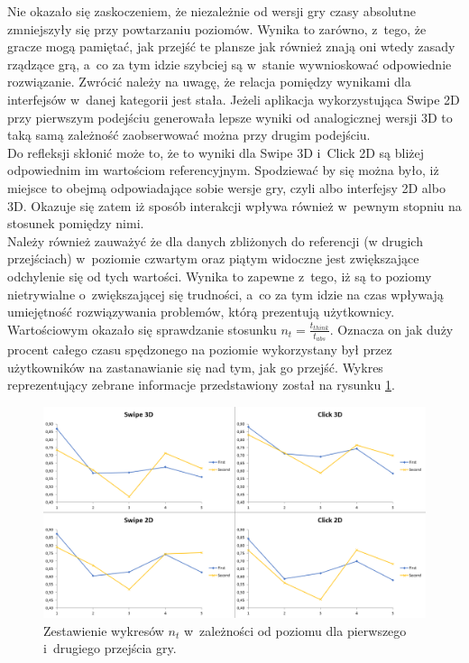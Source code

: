 \documentclass[a4paper,12pt,numbers=noenddot]{report}
\begin{document}
Nie okazało się zaskoczeniem, że niezależnie od wersji gry czasy absolutne zmniejszyły się przy powtarzaniu poziomów. Wynika to zarówno, z~tego, że gracze mogą pamiętać, jak przejść te plansze jak również znają oni wtedy zasady rządzące grą, a~co za tym idzie szybciej są w~stanie wywnioskować odpowiednie rozwiązanie. Zwrócić należy na uwagę, że relacja pomiędzy wynikami dla interfejsów w~danej kategorii jest stała. Jeżeli aplikacja wykorzystująca Swipe 2D przy pierwszym podejściu generowała lepsze wyniki od analogicznej wersji 3D to taką samą zależność zaobserwować można przy drugim podejściu.\\
Do refleksji skłonić może to, że to wyniki dla Swipe 3D i~Click 2D są bliżej odpowiednim im wartościom referencyjnym. Spodziewać by się można było, iż miejsce to obejmą odpowiadające sobie wersje gry, czyli albo interfejsy 2D albo 3D. Okazuje się zatem iż sposób interakcji wpływa również w~pewnym stopniu na stosunek pomiędzy nimi. \\
Należy również zauważyć że dla danych zbliżonych do referencji (w drugich przejściach) w~poziomie czwartym oraz piątym widoczne jest zwiększające odchylenie się od tych wartości. Wynika to zapewne z~tego, iż są to poziomy nietrywialne o~zwiększającej się trudności, a~co za tym idzie na czas wpływają umiejętność rozwiązywania problemów, którą prezentują użytkownicy.\\

Wartościowym okazało się sprawdzanie stosunku $n_{t} = \frac{t_{think}}{t_{abs}}$. Oznacza on jak duży procent całego czasu spędzonego na poziomie wykorzystany był przez użytkowników na zastanawianie się nad tym, jak go przejść. Wykres reprezentujący zebrane informacje przedstawiony został na rysunku \ref{fig:diag:ref:tThink_tAbs}.

\begin{figure}[h!]
	\centering
  	\includegraphics[width=\linewidth]{diag/ref_tThink_tAbs.png}
	\caption{Zestawienie wykresów $n_{t}$ w~zależności od poziomu dla pierwszego i~drugiego przejścia gry.}
	\label{fig:diag:ref:tThink_tAbs}
\end{figure}
\end{document}

